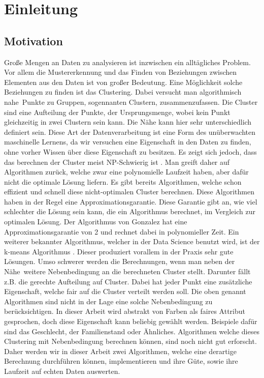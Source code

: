 
\chapter{Einleitung} \label{chap:Einleitung}

\section{Motivation}
    Große Mengen an Daten zu analysieren ist inzwischen ein alltägliches Problem. Vor allem die Mustererkennung und das Finden von Beziehungen zwischen Elementen aus den Daten ist von großer Bedeutung. Eine Möglichkeit solche Beziehungen zu finden ist das Clustering. Dabei versucht man algorithmisch \glqq nahe\grqq \ Punkte zu Gruppen, sogennanten Clustern, zusammenzufassen. Die Cluster sind eine Aufteilung der Punkte, der Ursprungsmenge, wobei kein Punkt gleichzeitig in zwei Clustern sein kann. Die Nähe kann hier sehr unterschiedlich definiert sein. Diese Art der Datenverarbeitung ist eine Form des unüberwachten maschinelle Lernens, da wir versuchen eine Eigenschaft in den Daten zu finden, ohne vorher Wissen über diese Eigenschaft zu besitzen.\newline
    Es zeigt sich jedoch, dass das berechnen der Cluster meist NP-Schwierig ist \cite{Clustering_Skript}. Man greift daher auf Algorithmen zurück, welche zwar eine polynomielle Laufzeit haben, aber dafür nicht die optimale Lösung liefern. Es gibt bereits Algorithmen, welche schon effizient und schnell diese nicht-optimalen Cluster berechnen. Diese Algorithmen haben in der Regel eine Approximationsgarantie. Diese Garantie gibt an, wie viel schlechter die Lösung sein kann, die ein Algorithmus berechnet, im Vergleich zur optimalen Lösung. Der Algorithmus von Gonzalez \cite{GONZALEZ1985293} hat eine Approximationsgarantie von 2 und rechnet dabei in polynomieller Zeit. Ein weiterer bekannter Algorithmus, welcher in der Data Science benutzt wird, ist der k-means Algorithmus \cite{macqueen1967some}. Dieser produziert vorallem in der Praxis sehr gute Lösungen. \newline 
    Umso schwerer werden die Berechnungen, wenn man neben der \glqq Nähe\grqq \ weitere Nebenbedingung an die berechneten Cluster stellt. Darunter fällt z.B. die gerechte Aufteilung auf Cluster. Dabei hat jeder Punkt eine zusätzliche Eigenschaft, welche fair auf die Cluster verteilt werden soll. Die oben genannt Algorithmen sind nicht in der Lage eine solche Nebenbedingung zu berücksichtigen. In dieser Arbeit wird abstrakt von Farben als faires Attribut gesprochen, doch diese Eigenschaft kann beliebig gewählt werden. Beispiele dafür sind das Geschlecht, der Familienstand oder Ähnliches. \newline
    Algorithmen welche dieses Clustering mit Nebenbedingung berechnen können, sind noch nicht gut erforscht. Daher werden wir in dieser Arbeit zwei Algorithmen, welche eine derartige Berechnung durchführen können, implementieren und ihre Güte, sowie ihre Laufzeit auf echten Daten auswerten.
    

